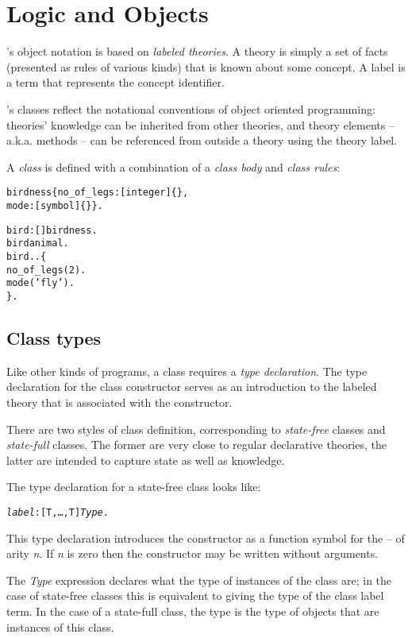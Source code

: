 \chapter{Logic and Objects}
\label{lo}

\go's object notation is based on \emph{labeled theories}. A theory is simply a set of facts (presented as rules of various kinds) that is known about some concept. A label is a term that represents the concept identifier.

\go's classes reflect the notational conventions of object oriented programming: theories' knowledge can be inherited from other theories, and theory elements -- a.k.a. methods -- can be referenced from outside a theory using the theory label.

A \emph{class} is defined with a combination of a \emph{class body} and \emph{class rules}:
\begin{alltt}
birdness \impl \{no\_of\_legs:[integer]\{\}, 
       mode:[symbol]\{\}\}.

bird:[]\conarrow{}birdness.
bird\classarrow{}animal.
bird..\{
  no\_of\_legs(2).
  mode('fly').
\}.
\end{alltt}




\section{Class types}
\label{objects:classtype}

Like other kinds of programs, a class requires a \emph{type declaration}. The type declaration for the class constructor serves as an introduction to the labeled theory that is associated with the constructor. 

There are two styles of class definition, corresponding to \emph{state-free} classes and \emph{state-full} classes. The former are very close to regular declarative theories, the latter are intended to capture state as well as knowledge.

The type declaration for a state-free class looks like:
\begin{alltt}
\emph{label}:[T,\ldots,T\subn] \conarrow{} \emph{Type}.
\end{alltt}
This type declaration introduces the constructor  as a function symbol for the  -- of arity \emph{n}. If \emph{n} is zero then the constructor may be written without arguments.

The \emph{Type} expression declares what the type of instances of the class are; in the case of state-free classes this is equivalent to giving the type of the class label term. In the case of a state-full class, the type is the type of objects that are instances of this class.

